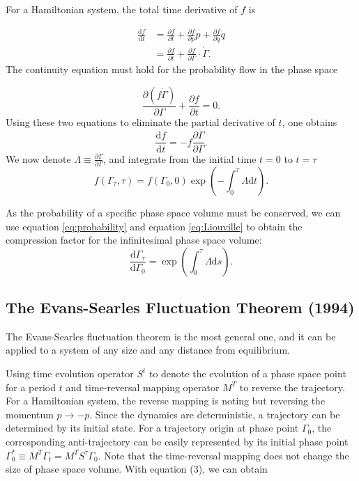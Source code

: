 \documentclass[ reprint, amsmath,amssymb, aps,]{revtex4-1}
\begin{document}
For a Hamiltonian system, the total time derivative of $f$ is 

\begin{equation}\label{eq:probability}
\begin{split}
\frac{\mathrm{d}f}{\mathrm{d}t}
&=\frac{\partial f}{\partial t}+\frac{\partial f}{\partial p}\dot{p}+\frac{\partial f}{\partial q}\dot{q}\\
&=\frac{\partial f}{\partial t}+\frac{\partial f}{\partial \Gamma}\cdot \dot\Gamma.
\end{split}
\end{equation}
The continuity equation must hold for the probability flow in the phase space

\begin{equation}
\frac{\partial (f\dot{\Gamma})}{\partial \Gamma}+\frac{\partial f}{\partial t}=0.
\end{equation}
Using these two equations to eliminate the partial derivative of $t$, one obtains
\begin{equation}
\frac{\mathrm{d} f}{\mathrm{d} t}=-f\frac{\partial \dot{\Gamma}}{\partial \Gamma}.
\end{equation}
We now denote $\Lambda \equiv\frac{\partial \dot\Gamma}{\partial \Gamma}$, and integrate from the initial time $t=0$ to  $t=\tau$
\begin{equation}\label{eq:Liouville}
f(\Gamma_\tau,\tau)=f\left(\Gamma_0,0\right)\exp\left(-\int_0^\tau \Lambda\mathrm{d}t\right).
\end{equation}

As the probability of a specific phase space volume must be conserved, we can use equation \ref{eq:probability} and equation \ref{eq:Liouville} to obtain the compression factor for the infinitesimal phase space volume:
\begin{equation}
\frac{\mathrm{d}\Gamma_\tau}{\mathrm{d}\Gamma_0}=\exp\left(\int_0^\tau\Lambda\mathrm{d}s\right).
\end{equation}

\subsection{The Evans-Searles Fluctuation Theorem (1994)}

The Evans-Searles fluctuation theorem is the most general one, and it can be applied to a system of any size and any distance from equilibrium.

Using time evolution operator $S^t$ to denote the evolution of a phase space point for a period $t$ and time-reversal mapping operator $M^T$ to reverse the trajectory. For a Hamiltonian system, the reverse mapping is noting but reversing the momentum $p\to -p$. Since the dynamics are deterministic, a trajectory can be determined by its initial state. For a trajectory origin at phase point $\Gamma_0$, the corresponding anti-trajectory can be easily represented by its initial phase point $\Gamma^*_0 \equiv M^T\Gamma_t=M^T S^\tau\Gamma_0$. Note that the time-reversal mapping does not change the size of phase space volume. With equation (3), we can obtain
\end{document}
